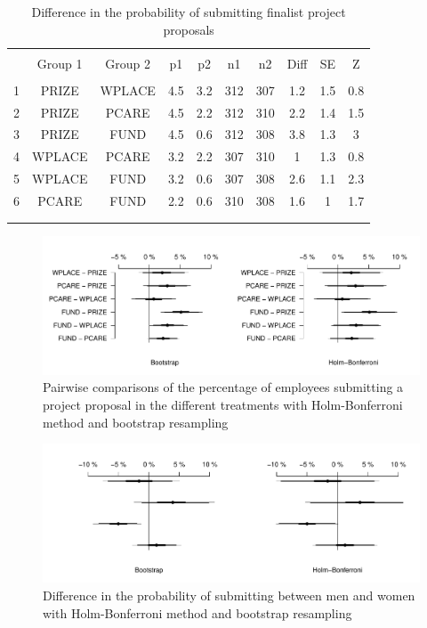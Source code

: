 \documentclass[11pt, titlepage]{article}
\begin{document}
\begin{table}
\begin{tabular}{@{}lccccccccc}
\end{tabular}
\end{table}\begin{table}
\centering
\caption{Difference in the probability of submitting finalist project proposals}
\label{app: finalist}
\begin{tabular}{@{}lccccccccc}
  \\[-1.8ex]\hline \hline \\[-1.8ex]
 & Group 1 & Group 2 & p1 & p2 & n1 & n2 & Diff & SE & Z \\ 
  \hline \\[-1.86ex]
1 & PRIZE & WPLACE & 4.5 & 3.2 & 312 & 307 & 1.2 & 1.5 & 0.8 \\ 
  2 & PRIZE & PCARE & 4.5 & 2.2 & 312 & 310 & 2.2 & 1.4 & 1.5 \\ 
  3 & PRIZE & FUND & 4.5 & 0.6 & 312 & 308 & 3.8 & 1.3 & 3 \\ 
  4 & WPLACE & PCARE & 3.2 & 2.2 & 307 & 310 & 1 & 1.3 & 0.8 \\ 
  5 & WPLACE & FUND & 3.2 & 0.6 & 307 & 308 & 2.6 & 1.1 & 2.3 \\ 
  6 & PCARE & FUND & 2.2 & 0.6 & 310 & 308 & 1.6 & 1 & 1.7 \\ 
   \\[-1.8ex]\hline \hline \\[-1.8ex]
\end{tabular}
\end{table}

\begin{figure} 
  \centering
  \caption{Pairwise comparisons of the percentage of employees submitting a project proposal in the different treatments with Holm-Bonferroni method and bootstrap resampling}
  \label{fig: participation}
  \includegraphics{Figures/pairwise-robust-1.pdf}
\end{figure}

\begin{figure} 
  \centering
  \caption{Difference in the probability of submitting between men and women with Holm-Bonferroni method and bootstrap resampling}
  \label{fig: gender robust}
  \includegraphics{Figures/gender-robust-1.pdf}
\end{figure}
\end{document}
